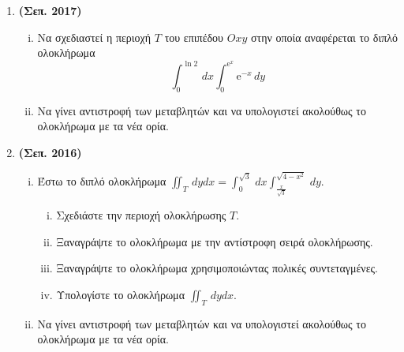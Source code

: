 \begin{enumerate}
  \item \textbf{(Σεπ. 2017)} 
    \begin{enumerate}[i)]
      \item Να σχεδιαστεί η περιοχή $T$ του επιπέδου $ Oxy $ στην 
        οποία αναφέρεται το διπλό ολοκλήρωμα 
        \[ 
          \int_{0} ^{\ln{2}} \,{dx} \int _{0}^{\mathrm{e}^{x}} \mathrm{e}^{-x} \,{dy} 
        \]
      \item Να γίνει αντιστροφή των μεταβλητών και να υπολογιστεί ακολούθως το 
        ολοκλήρωμα με τα νέα ορία.
    \end{enumerate}

  \item \textbf{(Σεπ. 2016)} 
    \begin{enumerate}[i)]
      \item Έστω το διπλό ολοκλήρωμα $ \iint_{T} \,{dy}{dx} = \int _{0}^{\sqrt{3}}
        \,{dx} \int _{\frac{x}{\sqrt{3}}}^{\sqrt{4-x^{2}}} \,{dy}$.
        \begin{enumerate}[i)]
          \item Σχεδιάστε την περιοχή ολοκλήρωσης $T$.
          \item Ξαναγράψτε το ολοκλήρωμα με την αντίστροφη σειρά ολοκλήρωσης.
          \item Ξαναγράψτε το ολοκλήρωμα χρησιμοποιώντας πολικές συντεταγμένες.
          \item Υπολογίστε το ολοκλήρωμα $ \iint_{T} \,{dy}{dx} $.
        \end{enumerate}

      \item Να γίνει αντιστροφή των μεταβλητών και να υπολογιστεί ακολούθως το 
        ολοκλήρωμα με τα νέα ορία.
    \end{enumerate}
\end{enumerate}



